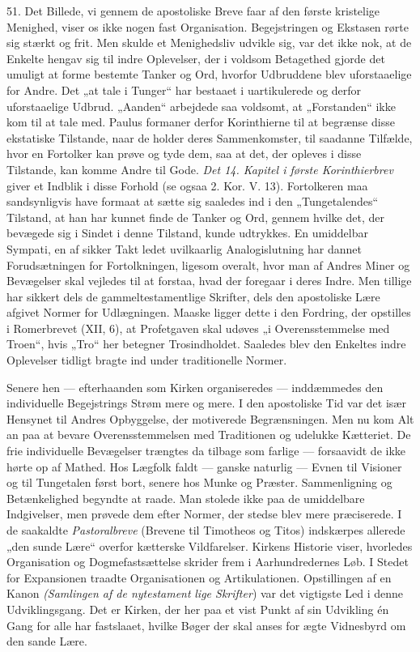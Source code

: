 \documentclass[12pt,a4paper,openany]{book}
\newcommand{\opage}[1]{\marginnote{\footnotesize\textit{[#1]}}}
\begin{document}
51. Det Billede, vi gennem de apostoliske Breve faar af den første
kristelige Menighed, viser os ikke nogen fast Organisation.
Begejstringen og Ekstasen rørte sig stærkt og frit. Men skulde et
Menighedsliv udvikle sig, var det ikke nok, at de Enkelte hengav sig til
indre Oplevelser, der i voldsom Betagethed
\opage{113}gjorde det umuligt at forme bestemte Tanker og Ord, hvorfor
Udbruddene blev uforstaaelige for Andre. Det „at tale i Tunger“ har
bestaaet i uartikulerede og derfor uforstaaelige Udbrud. „Aanden“
arbejdede saa voldsomt, at „Forstanden“ ikke kom til at tale med. Paulus
formaner derfor Korinthierne til at begrænse disse ekstatiske Tilstande,
naar de holder deres Sammenkomster, til saadanne Tilfælde, hvor en
Fortolker kan prøve og tyde dem, saa at det, der opleves i disse
Tilstande, kan komme Andre til Gode. \textit{Det 14. Kapitel i første
Korinthierbrev} giver et Indblik i disse Forhold (se ogsaa 2. Kor. V.
13). Fortolkeren maa sandsynligvis have formaat at sætte sig saaledes
ind i den „Tungetalendes“ Tilstand, at han har kunnet finde de Tanker og
Ord, gennem hvilke det, der bevægede sig i Sindet i denne Tilstand,
kunde udtrykkes. En umiddelbar Sympati, en af sikker Takt ledet
uvilkaarlig Analogislutning har dannet Forudsætningen for Fortolkningen,
ligesom overalt, hvor man af Andres Miner og Bevægelser skal vejledes
til at forstaa, hvad der foregaar i deres Indre. Men tillige har sikkert
dels de gammeltestamentlige Skrifter, dels den apostoliske Lære afgivet
Normer for Udlægningen. Maaske ligger dette i den Fordring, der
opstilles i Romerbrevet (XII, 6), at Profetgaven skal udøves „i
Overensstemmelse med Troen“, hvis „Tro“ her betegner Trosindholdet.
Saaledes blev den Enkeltes indre Oplevelser tidligt bragte ind under
traditionelle Normer.

Senere hen --- efterhaanden som Kirken organiseredes --- inddæmmedes den
individuelle Begejstrings Strøm mere og mere. I den apostoliske Tid var
det især Hensynet til Andres Opbyggelse, der motiverede Begrænsningen.
Men nu kom Alt an paa at bevare Overensstemmelsen med Traditionen og
udelukke Kætteriet. De frie individuelle Bevægelser trængtes da tilbage
som farlige --- forsaavidt de ikke hørte op af Mathed. Hos Lægfolk faldt
--- ganske naturlig --- Evnen til Visioner og til Tungetalen først bort,
senere hos Munke og Præster. Sammenligning og Betænkelighed begyndte at
raade. Man stolede ikke paa de umiddelbare Indgivelser, men prøvede dem
efter Normer, der stedse blev mere præciserede. I de saakaldte
\textit{Pastoralbreve} (Brevene til Timotheos og Titos) indskærpes
allerede „den sunde Lære“ overfor kætterske Vildfarelser. Kirkens
Historie viser, hvorledes Organisation og Dogmefastsættelse skrider frem
i Aarhundredernes Løb. I Stedet for Expansionen traadte Organisationen
og Artikulationen. Opstillingen af en Kanon \textit{(Samlingen af de
nytestament}%
\opage{114}\textit{lige Skrifter}) var det vigtigste Led i denne
Udviklingsgang. Det er Kirken, der her paa et vist Punkt af sin
Udvikling én Gang for alle har fastslaaet, hvilke Bøger der skal anses
for ægte Vidnesbyrd om den sande Lære.
\end{document}
